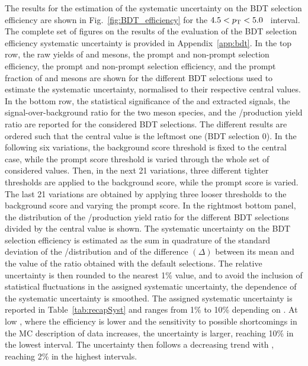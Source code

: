 The results for the estimation of the systematic uncertainty on the BDT selection efficiency are shown in Fig.~\ref{fig:BDT_efficiency} for the \mbox{$4.5<p_\mathrm{T}<5.0$~\gevc} \pt interval.  The complete set of figures on the results of the evaluation of the BDT selection efficiency systematic uncertainty is provided in Appendix~\ref{app:bdt}. In the top row, the raw yields of \ds and \dpl mesons, the prompt and non-prompt \ds selection efficiency, the prompt and non-prompt \dpl selection efficiency, and the prompt fraction of \ds and \dpl mesons are shown for the different BDT selections used to estimate the systematic uncertainty, normalised to their respective central values. In the bottom row, the statistical significance of the \ds and \dpl extracted signals, the signal-over-background ratio for the two meson species, and the \ds/\dpl production yield ratio are reported for the considered BDT selections. The different results are ordered such that the central value is the leftmost one (BDT selection 0). In the following six variations, the background score threshold is fixed to the central case, while the prompt score threshold is varied through the whole set of considered values. Then, in the next 21 variations, three different tighter thresholds are applied to the background score, while the prompt score is varied. The last 21 variations are obtained by applying three looser thresholds to the background score and varying the prompt score. In the rightmost bottom panel, the distribution of the \ds/\dpl production yield ratio for the different BDT selections divided by the central value is shown. The systematic uncertainty on the BDT selection efficiency is estimated as the sum in quadrature of the standard deviation of the \ds/\dpl distribution and of the difference $(\Delta)$ between its mean and the value of the ratio obtained with the default selections. The relative uncertainty is then rounded to the nearest 1\% value, and to avoid the inclusion of statistical fluctuations in the assigned systematic uncertainty, the \pt dependence of the systematic uncertainty is smoothed. The assigned systematic uncertainty is reported in Table~\ref{tab:recapSyst} and ranges from 1\% to 10\% depending on \pt. At low \pt, where the efficiency is lower and the sensitivity to possible shortcomings in the MC description of data increases, the uncertainty is larger, reaching 10\% in the lowest \pt interval. The uncertainty then follows a decreasing trend with \pt, reaching 2\% in the highest \pt intervals.

